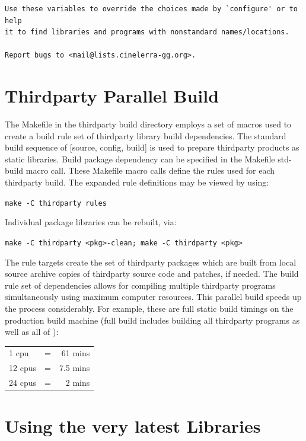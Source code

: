 \begin{verbatim}
Use these variables to override the choices made by `configure' or to help
it to find libraries and programs with nonstandard names/locations.

Report bugs to <mail@lists.cinelerra-gg.org>.

\end{verbatim}
\endgroup

\section{Thirdparty Parallel Build}
\label{sec:thirdparty_parallel_build}

The Makefile in the thirdparty build directory employs a set of macros used to create a build rule set of thirdparty library build dependencies.  The standard build sequence of [source, config, build] is used to prepare thirdparty products as static libraries.  Build package dependency can be specified in the Makefile std-build macro call.  These Makefile macro calls define the rules used for each thirdparty build.  The expanded rule definitions may be viewed by using:

\hspace{2em}\texttt{make -C thirdparty rules}

Individual package libraries can be rebuilt, via:

\hspace{2em}\texttt{make -C thirdparty <pkg>-clean;  make -C thirdparty <pkg>}

The rule targets create the set of thirdparty packages which are built from local source archive copies of thirdparty source code and patches, if needed.  The build rule set of dependencies allows for compiling multiple thirdparty programs simultaneously using maximum computer resources.  This parallel build speeds up the process considerably.  For example, these are full static build timings on the production build machine (full build includes building all thirdparty programs as well as all of \CGG{}):

\begin{center}
	\begin{tabular}{@{}lcr}
		1 cpu & = & 61 mins\\
		12 cpus & = & 7.5 mins\\
		24 cpus & = & 2 mins\\
	\end{tabular}
\end{center}

\section{Using the very latest Libraries}
\label{sec:latest_libraries}

